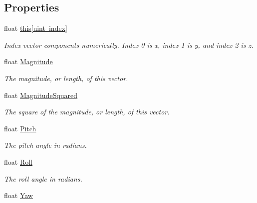 \subsection*{Properties}
\begin{DoxyCompactItemize}
\item 
float \mbox{\hyperlink{struct_leap_1_1_vector_af92a9eb06277dd8eebbf3e1cf61360ca}{this\mbox{[}uint index\mbox{]}}}
\begin{DoxyCompactList}\small\item\em Index vector components numerically. Index 0 is x, index 1 is y, and index 2 is z. \end{DoxyCompactList}\item 
float \mbox{\hyperlink{struct_leap_1_1_vector_afd51a6a7664efda2e5dde7a5e6a5313a}{Magnitude}}
\begin{DoxyCompactList}\small\item\em The magnitude, or length, of this vector. \end{DoxyCompactList}\item 
float \mbox{\hyperlink{struct_leap_1_1_vector_aec7fdb9c75f451a3c0a28fddfba97143}{Magnitude\+Squared}}
\begin{DoxyCompactList}\small\item\em The square of the magnitude, or length, of this vector. \end{DoxyCompactList}\item 
float \mbox{\hyperlink{struct_leap_1_1_vector_acc5105f55edfdc7a3d5cc6cd6cb8dc8f}{Pitch}}
\begin{DoxyCompactList}\small\item\em The pitch angle in radians. \end{DoxyCompactList}\item 
float \mbox{\hyperlink{struct_leap_1_1_vector_afa775e6c104537383493e027f6a462f7}{Roll}}
\begin{DoxyCompactList}\small\item\em The roll angle in radians. \end{DoxyCompactList}\item 
float \mbox{\hyperlink{struct_leap_1_1_vector_ac6f5feaf332862e1ebc0d5b219e55eaa}{Yaw}}

\end{DoxyCompactItemize}
